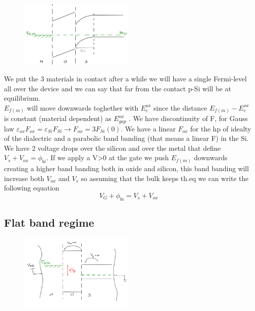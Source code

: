 \begin{figure}
\includegraphics[width=0.5\textwidth]{mos_theq.png}
\end{figure}

We put the 3 materials in contact after a while we will have a single Fermi-level all over the device and we can say that far from the contact p-Si will be at equilibrium.\\
$E_{f(m)}$ will move downwards toghether with $E_c^{ox}$ since the distance $E_{f(m)}-E_c^{ox}$ is constant (material dependent) as $E_{gap}^{ox}$ .
We have discontinuity of F, for Gauss law $\varepsilon_{ox}F_{ox}=\varepsilon_{Si}F_{Si}\rightarrow F_{ox}=3F_{Si}(0)$. We have a linear $F_{ox}$ for the hp of idealty of the dialectric and a parabolic band banding (that means a linear F) in the Si.\\
We have 2 voltage drops over the silicon and over the metal that define $V_s+V_{ox}=\phi_{bi}$.
If we apply a V>0 at the gate we push $E_{f(m)}$ downwards creating a higher band banding both in oxide and silicon, this band banding will increase both $V_{ox}$ and $V_{s}$ so assuming that the bulk keeps th.eq we can write the following equation
\begin{equation}
V_{G}+\phi_{bi}=V_s+V_{ox}
\end{equation}

\subsection{Flat band regime}

\begin{figure}
\includegraphics[width=0.5\textwidth]{mos_vfb.png}
\end{figure}

